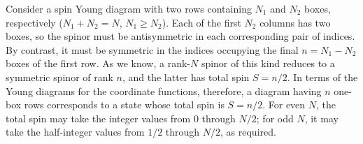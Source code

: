 Consider a spin Young diagram with two rows containing $N_1$ and $N_2$ boxes, respectively ($N_1+N_2=N$, $N_1\geq N_2$). Each of the first $N_2$ columns has two boxes, so the spinor must be antisymmetric in each corresponding pair of indices. By contrast, it must be symmetric in the indices occupying the final $n=N_1-N_2$ boxes of the first row. As we know, a rank-$N$ spinor of this kind reduces to a symmetric spinor of rank $n$, and the latter has total spin $S=n/2$. In terms of the Young diagrams for the coordinate functions, therefore, a diagram having $n$ one-box rows corresponds to a state whose total spin is $S=n/2$. For even $N$, the total spin may take the integer values from 0 through $N/2$; for odd $N$, it may take the half-integer values from $1/2$ through $N/2$, as required.
